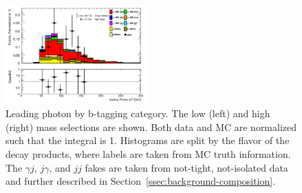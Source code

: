 \begin{figure}[p]
  \includegraphics[width=0.48\textwidth]{chapters/chapter5_yybb/images/data_MC_comparison/h_SR_h_2t_nominal_leadingPhoton_pt.pdf}
  \caption[Leading photon \pt by \btagging category]{Leading photon \pt by b-tagging category. The low (left) and high (right) mass selections are shown. Both data and MC are normalized such that the integral is 1. Histograms are split by the flavor of the \Hbb decay products, where labels are taken from \gls{MC} truth information. The $\gamma j$, $j\gamma$, and $jj$ fakes are taken from not-tight, not-isolated data and further described in Section~\ref{ssec:background-composition}.
  \label{fig:photon_l_pt}}
\end{figure}

